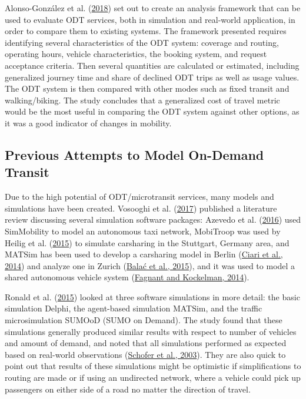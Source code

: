 \documentclass[
]{article}
\begin{document}
Alonso-González et al. (\protect\hyperlink{ref-Alonso-Gonzalez2018}{2018}) set out to create an analysis framework that can be used to evaluate ODT services, both in simulation and real-world application, in order to compare them to existing systems. The framework presented requires identifying several characteristics of the ODT system: coverage and routing, operating hours, vehicle characteristics, the booking system, and request acceptance criteria. Then several quantities are calculated or estimated, including generalized journey time and share of declined ODT trips as well as usage values. The ODT system is then compared with other modes such as fixed transit and walking/biking. The study concludes that a generalized cost of travel metric would be the most useful in comparing the ODT system against other options, as it was a good indicator of changes in mobility.

\hypertarget{previous-attempts-to-model-on-demand-transit}{%
\subsection{Previous Attempts to Model On-Demand Transit}\label{previous-attempts-to-model-on-demand-transit}}

Due to the high potential of ODT/microtransit services, many models and simulations have been created. Vosooghi et al. (\protect\hyperlink{ref-Vosooghi2017}{2017}) published a literature review discussing several simulation software packages: Azevedo et al. (\protect\hyperlink{ref-Azevedo2016}{2016}) used SimMobility to model an autonomous taxi network, MobiTroop was used by Heilig et al. (\protect\hyperlink{ref-Heilig2015}{2015}) to simulate carsharing in the Stuttgart, Germany area, and MATSim has been used to develop a carsharing model in Berlin (\protect\hyperlink{ref-Ciari2014}{Ciari et al., 2014}) and analyze one in Zurich (\protect\hyperlink{ref-Balac2015}{Balać et al., 2015}), and it was used to model a shared autonomous vehicle system (\protect\hyperlink{ref-Fagnant2014}{Fagnant and Kockelman, 2014}).

Ronald et al. (\protect\hyperlink{ref-Ronald2015}{2015}) looked at three software simulations in more detail: the basic simulation Delphi, the agent-based simulation MATSim, and the traffic microsimulation SUMOoD (SUMO on Demand). The study found that these simulations generally produced similar results with respect to number of vehicles and amount of demand, and noted that all simulations performed as expected based on real-world observations (\protect\hyperlink{ref-Schofer2003}{Schofer et al., 2003}). They are also quick to point out that results of these simulations might be optimistic if simplifications to routing are made or if using an undirected network, where a vehicle could pick up passengers on either side of a road no matter the direction of travel.
\end{document}
